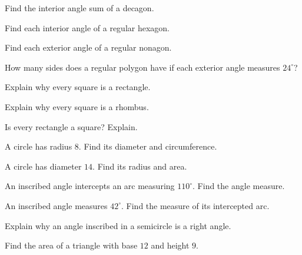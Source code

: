 \begin{exercise}[1]
Find the interior angle sum of a decagon.
\end{exercise}

\begin{exercise}[1]
Find each interior angle of a regular hexagon.
\end{exercise}

\begin{exercise}[1]
Find each exterior angle of a regular nonagon.
\end{exercise}

\begin{exercise}[2]
How many sides does a regular polygon have if each exterior angle measures
\(24^\circ\)?
\end{exercise}

\begin{exercise}[2]
Explain why every square is a rectangle.
\end{exercise}

\begin{exercise}[2]
Explain why every square is a rhombus.
\end{exercise}

\begin{exercise}[2]
Is every rectangle a square? Explain.
\end{exercise}

\begin{exercise}[1]
A circle has radius \(8\). Find its diameter and circumference.
\end{exercise}

\begin{exercise}[1]
A circle has diameter \(14\). Find its radius and area.
\end{exercise}

\begin{exercise}[2]
An inscribed angle intercepts an arc measuring \(110^\circ\). Find the angle
measure.
\end{exercise}

\begin{exercise}[2]
An inscribed angle measures \(42^\circ\). Find the measure of its intercepted
arc.
\end{exercise}

\begin{exercise}[2]
Explain why an angle inscribed in a semicircle is a right angle.
\end{exercise}

\begin{exercise}[1]
Find the area of a triangle with base \(12\) and height \(9\).
\end{exercise}

